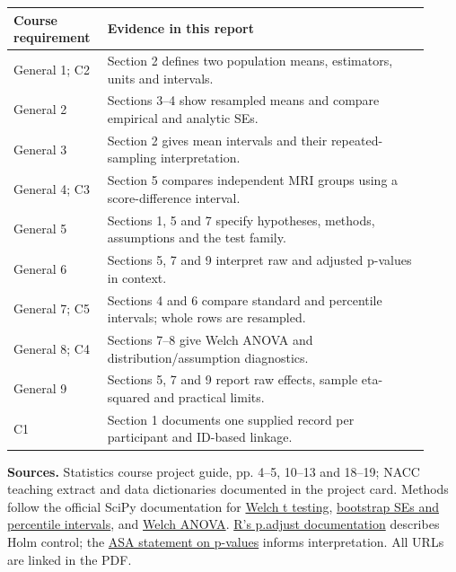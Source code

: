 \documentclass[11pt]{article}
\begin{document}
\begin{center}\small
\begin{tabular}{@{}p{0.19\linewidth}p{0.73\linewidth}@{}}
\toprule
Course requirement & Evidence in this report \\
\midrule
General 1; C2 & Section 2 defines two population means, estimators, units and intervals. \\
General 2 & Sections 3--4 show resampled means and compare empirical and analytic SEs. \\
General 3 & Section 2 gives mean intervals and their repeated-sampling interpretation. \\
General 4; C3 & Section 5 compares independent MRI groups using a score-difference interval. \\
General 5 & Sections 1, 5 and 7 specify hypotheses, methods, assumptions and the test family. \\
General 6 & Sections 5, 7 and 9 interpret raw and adjusted p-values in context. \\
General 7; C5 & Sections 4 and 6 compare standard and percentile intervals; whole rows are resampled. \\
General 8; C4 & Sections 7--8 give Welch ANOVA and distribution/assumption diagnostics. \\
General 9 & Sections 5, 7 and 9 report raw effects, sample eta-squared and practical limits. \\
C1 & Section 1 documents one supplied record per participant and ID-based linkage. \\
\bottomrule
\end{tabular}
\end{center}

{\small
\textbf{Sources.} Statistics course project guide, pp. 4--5, 10--13 and
18--19; NACC teaching extract and data dictionaries documented in the
project card. Methods follow the official SciPy documentation for
\href{https://docs.scipy.org/doc/scipy/reference/generated/scipy.stats.ttest_ind.html}{Welch t testing},
\href{https://docs.scipy.org/doc/scipy/reference/generated/scipy.stats.bootstrap.html}{bootstrap SEs and percentile intervals}, and
\href{https://docs.scipy.org/doc/scipy/reference/generated/scipy.stats.f_oneway.html}{Welch ANOVA}.
\href{https://stat.ethz.ch/R-manual/R-devel/library/stats/html/p.adjust.html}{R's p.adjust documentation}
describes Holm control; the
\href{https://www.amstat.org/asa/files/pdfs/P-ValueStatement.pdf}{ASA statement on p-values}
informs interpretation. All URLs are linked in the PDF.\par}
\end{document}
